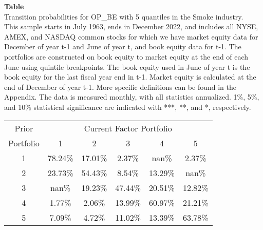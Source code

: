 \begin{table*}[ht!]
\raggedright
{}
\label{tab: transition_probs_OP_BE_Smoke_with_5_quantiles}
\textbf{Table \thetable} \\
Transition probabilities for OP_BE with 5 quantiles in the Smoke industry. \\
\hspace*{1em}This sample starts in July 1963, ends in December 2022, and includes all NYSE, AMEX, and NASDAQ common stocks for which we have market equity data for December of year t-1 and June of year t, and book equity data for t-1. The portfolios are constructed on book equity to market equity at the end of each June using quintile breakpoints.  The book equity used in June of year t is the book equity for the last fiscal year end in t-1.  Market equity is calculated at the end of December of year t-1.  More specific definitions can be found in the Appendix.  The data is measured monthly, with all statistics annualized.  1\%, 5\%, and 10\% statistical significance are indicated with ***, **, and *, respectively. \\
\vspace{0.5em}
\centering
\begin{adjustbox}{max width=\textwidth}
\begin{tabular}{@{}cccccc@{}}
\toprule
Prior & \multicolumn{5}{c}{Current Factor Portfolio} \\
Portfolio & 1 & 2 & 3 & 4 & 5 \\
\midrule
1 & 78.24\% & 17.01\% & 2.37\% & nan\% & 2.37\% \\
2 & 23.73\% & 54.43\% & 8.54\% & 13.29\% & nan\% \\
3 & nan\% & 19.23\% & 47.44\% & 20.51\% & 12.82\% \\
4 & 1.77\% & 2.06\% & 13.99\% & 60.97\% & 21.21\% \\
5 & 7.09\% & 4.72\% & 11.02\% & 13.39\% & 63.78\% \\
\bottomrule
\end{tabular}
\end{adjustbox}
\end{table*}
